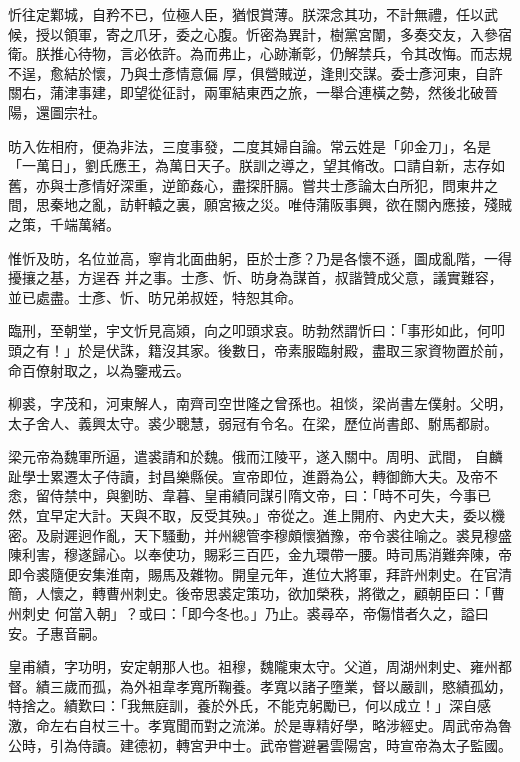 \begin{pinyinscope}
 忻往定鄴城，自矜不已，位極人臣，猶恨賞薄。朕深念其功，不計無禮，任以武候，授以領軍，寄之爪牙，委之心腹。忻密為異計，樹黨宮闈，多奏交友，入參宿衛。朕推心待物，言必依許。為而弗止，心跡漸彰，仍解禁兵，令其改悔。而志規不逞，愈結於懷，乃與士彥情意偏
 厚，俱營賊逆，逢則交謀。委士彥河東，自許關右，蒲津事建，即望從征討，兩軍結東西之旅，一舉合連橫之勢，然後北破晉陽，還圖宗社。



 昉入佐相府，便為非法，三度事發，二度其婦自論。常云姓是「卯金刀」，名是「一萬日」，劉氏應王，為萬日天子。朕訓之導之，望其脩改。口請自新，志存如舊，亦與士彥情好深重，逆節姦心，盡探肝膈。嘗共士彥論太白所犯，問東井之間，思秦地之亂，訪軒轅之裏，願宮掖之災。唯侍蒲阪事興，欲在關內應接，殘賊之策，千端萬緒。



 惟忻及昉，名位並高，寧肯北面曲躬，臣於士彥？乃是各懷不遜，圖成亂階，一得擾攘之基，方逞吞
 并之事。士彥、忻、昉身為謀首，叔諧贊成父意，議實難容，並已處盡。士彥、忻、昉兄弟叔姪，特恕其命。



 臨刑，至朝堂，宇文忻見高熲，向之叩頭求哀。昉勃然謂忻曰：「事形如此，何叩頭之有！」於是伏誅，籍沒其家。後數日，帝素服臨射殿，盡取三家資物置於前，命百僚射取之，以為鑒戒云。



 柳裘，字茂和，河東解人，南齊司空世隆之曾孫也。祖惔，梁尚書左僕射。父明，太子舍人、義興太守。裘少聰慧，弱冠有令名。在梁，歷位尚書郎、駙馬都尉。



 梁元帝為魏軍所逼，遣裘請和於魏。俄而江陵平，遂入關中。周明、武間，
 自麟趾學士累遷太子侍讀，封昌樂縣侯。宣帝即位，進爵為公，轉御飾大夫。及帝不悆，留侍禁中，與劉昉、韋暮、皇甫績同謀引隋文帝，曰：「時不可失，今事已然，宜早定大計。天與不取，反受其殃。」帝從之。進上開府、內史大夫，委以機密。及尉遲迥作亂，天下騷動，并州總管李穆頗懷猶豫，帝令裘往喻之。裘見穆盛陳利害，穆遂歸心。以奉使功，賜彩三百匹，金九環帶一腰。時司馬消難奔陳，帝即令裘隨便安集淮南，賜馬及雜物。開皇元年，進位大將軍，拜許州刺史。在官清簡，人懷之，轉曹州刺史。後帝思裘定策功，欲加榮秩，將徵之，顧朝臣曰：「曹州刺史
 何當入朝」？或曰：「即今冬也。」乃止。裘尋卒，帝傷惜者久之，謚曰安。子惠音嗣。



 皇甫績，字功明，安定朝那人也。祖穆，魏隴東太守。父道，周湖州刺史、雍州都督。績三歲而孤，為外祖韋孝寬所鞠養。孝寬以諸子墮業，督以嚴訓，愍績孤幼，特捨之。績歎曰：「我無庭訓，養於外氏，不能克躬勵已，何以成立！」深自感激，命左右自杖三十。孝寬聞而對之流涕。於是專精好學，略涉經史。周武帝為魯公時，引為侍讀。建德初，轉宮尹中士。武帝嘗避暑雲陽宮，時宣帝為太子監國。




\end{pinyinscope}
